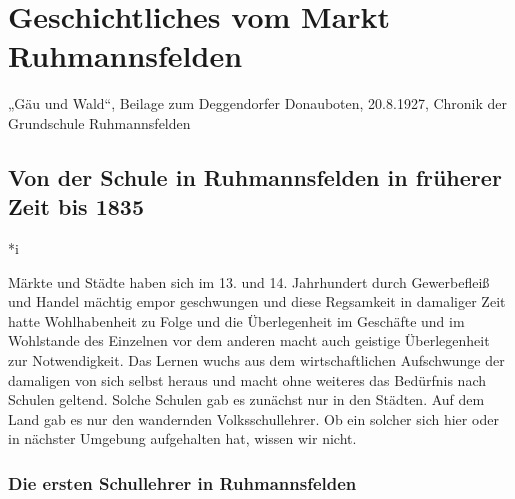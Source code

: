 \documentclass[12pt,a4paper]{book}
\begin{document}
\part{Geschichtliches vom Markt Ruhmannsfelden}

„Gäu und Wald“, Beilage zum Deggendorfer Donauboten, 20.8.1927, Chronik der
Grundschule Ruhmannsfelden

\chapter{Von der Schule in Ruhmannsfelden in früherer Zeit bis 1835}
*i

Märkte und Städte haben sich im 13. und 14. Jahrhundert durch Gewerbefleiß und
Handel mächtig empor geschwungen und diese Regsamkeit in damaliger Zeit hatte
Wohlhabenheit zu Folge und die Überlegenheit im Geschäfte und im Wohlstande des
Einzelnen vor dem anderen macht auch geistige Überlegenheit zur Notwendigkeit.
Das Lernen wuchs aus dem wirtschaftlichen Aufschwunge der damaligen von sich
selbst heraus und macht ohne weiteres das Bedürfnis nach Schulen geltend. Solche
Schulen gab es zunächst nur in den Städten. Auf dem Land gab es nur den
wandernden Volksschullehrer. Ob ein solcher sich hier oder in nächster Umgebung
aufgehalten hat, wissen wir nicht.

\section{Die ersten Schullehrer in Ruhmannsfelden}
\end{document}
